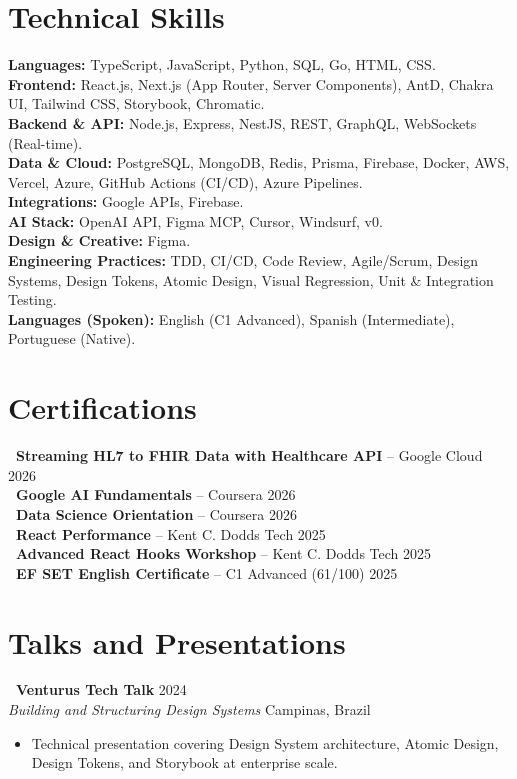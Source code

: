 \documentclass[10pt,a4paper]{article}
\begin{document}
\section{Technical Skills}
\noindent
\textbf{Languages:} TypeScript, JavaScript, Python, SQL, Go, HTML, CSS. \\
\textbf{Frontend:} React.js, Next.js (App Router, Server Components), AntD, Chakra UI, Tailwind CSS, Storybook, Chromatic. \\
\textbf{Backend \& API:} Node.js, Express, NestJS, REST, GraphQL, WebSockets (Real-time). \\
\textbf{Data \& Cloud:} PostgreSQL, MongoDB, Redis, Prisma, Firebase, Docker, AWS, Vercel, Azure, GitHub Actions (CI/CD), Azure Pipelines. \\
\textbf{Integrations:} Google APIs, Firebase. \\
\textbf{AI Stack:} OpenAI API, Figma MCP, Cursor, Windsurf, v0. \\
\textbf{Design \& Creative:} Figma. \\
\textbf{Engineering Practices:} TDD, CI/CD, Code Review, Agile/Scrum, Design Systems, Design Tokens, Atomic Design, Visual Regression, Unit \& Integration Testing. \\
\textbf{Languages (Spoken):} English (C1 Advanced), Spanish (Intermediate), Portuguese (Native).

\section{Certifications}
\noindent\textbf{\textbullet~Streaming HL7 to FHIR Data with Healthcare API} -- Google Cloud \hfill 2026 \\
\noindent\textbf{\textbullet~Google AI Fundamentals} -- Coursera \hfill 2026 \\
\noindent\textbf{\textbullet~Data Science Orientation} -- Coursera \hfill 2026 \\
\noindent\textbf{\textbullet~React Performance} -- Kent C. Dodds Tech \hfill 2025 \\
\noindent\textbf{\textbullet~Advanced React Hooks Workshop} -- Kent C. Dodds Tech \hfill 2025 \\
\noindent\textbf{\textbullet~EF SET English Certificate} -- C1 Advanced (61/100) \hfill 2025

\section{Talks and Presentations}
\noindent\textbf{\textbullet~Venturus Tech Talk} \hfill 2024 \\
\textit{Building and Structuring Design Systems} \hfill Campinas, Brazil
\begin{itemize}[leftmargin=*,label=\textendash,itemsep=2pt,parsep=0pt,topsep=2pt]
  \item Technical presentation covering Design System architecture, Atomic Design, Design Tokens, and Storybook at enterprise scale.
\end{itemize}
\end{document}
